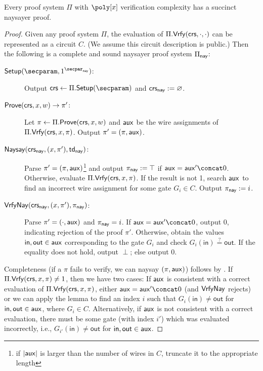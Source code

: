 \begin{theorem}\label{thm:naysayer}
    Every proof system $\Pi$ with $\poly[x]$ verification complexity has a succinct naysayer proof.
\end{theorem}
\begin{proof}
Given any proof system $\Pi$, the evaluation of $\Pi.\mathsf{Vrfy}(\mathsf{crs},\cdot,\cdot)$ can be represented as a circuit $C$. (We assume this circuit description is public.) 
Then the following is a complete and sound naysayer proof system $\Pi_{\mathsf{nay}}$:

\begin{description}
    \item[$\setup(\secparam, \naysecparam)$:] Output $\crs \gets \Pi.\setup(\secparam)$ and $\mathsf{crs}_{\mathsf{nay}} := \varnothing$.
    \item[$\mathsf{Prove}(\mathsf{crs}, x, w) \to \pi'$:] Let $\pi \gets \Pi.\mathsf{Prove}(\mathsf{crs}, x, w)$ and $\mathsf{aux}$ be the wire assignments of $\Pi.\mathsf{Vrfy}(\mathsf{crs}, x, \pi)$. Output $\pi' = (\pi, \mathsf{aux})$.
    \item[$\mathsf{Naysay}(\mathsf{crs}_{\mathsf{nay}}, (x, \pi'), \mathsf{td}_{\mathsf{nay}})$:] Parse $\pi' = (\pi, \mathsf{aux})$\footnote{if $\lvert \mathsf{aux} \rvert$ is larger than the number of wires in $C$, truncate it to the appropriate length} and output $\pi_{\mathsf{nay}} := \top$ if $\aux = \aux' \concat 0$. Otherwise, evaluate $\Pi.\mathsf{Vrfy}(\mathsf{crs}, x, \pi)$. If the result is not 1, search $\mathsf{aux}$ to find an incorrect wire assignment for some gate $G_i \in C$. %
    Output $\pi_{\mathsf{nay}} := i$.
    \item[${\mathsf{Vrfy}}\mathsf{Nay}(\mathsf{crs}_{\mathsf{nay}}, (x, \pi'), \pi_{\mathsf{nay}})$:] Parse $\pi' = (\cdot, \mathsf{aux})$ and $\pi_{\mathsf{nay}} = i$. If $\aux = \aux' \concat 0$, output 0, indicating rejection of the proof $\pi'$. Otherwise, obtain the values $\mathsf{in},\mathsf{out} \in \mathsf{aux}$ corresponding to the gate $G_i$ %
    and check $G_i(\mathsf{in}) \stackrel{?}{=} \mathsf{out}$. If the equality does not hold, output $\perp$; else output 0.
\end{description}

Completeness (if a $\pi$ fails to verify, we can naysay $(\pi, \mathsf{aux})$) follows by . If $\Pi.\mathsf{Vrfy}(\mathsf{crs},x,\pi) \neq 1$, then we have two cases: If $\mathsf{aux}$ is consistent with a correct evaluation of $\Pi.\mathsf{Vrfy}(\mathsf{crs}, x, \pi)$, either $\aux = \aux' \concat 0$ (and ${\mathsf{Vrfy}}\mathsf{Nay}$ rejects) or we can apply the lemma to find an index $i$ such that $G_i(\mathsf{in}) \neq \mathsf{out}$ for $\mathsf{in}, \mathsf{out} \in \mathsf{aux}$, where $G_i \in C$. Alternatively, if $\mathsf{aux}$ is not consistent with a correct evaluation, there must be some gate (with index $i'$) which was evaluated incorrectly, i.e., $G_{i'}(\mathsf{in}) \neq \mathsf{out}$ for $\mathsf{in}, \mathsf{out} \in \mathsf{aux}$.


\end{proof}
